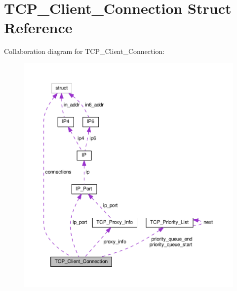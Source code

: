 \hypertarget{struct_t_c_p___client___connection}{\section{T\+C\+P\+\_\+\+Client\+\_\+\+Connection Struct Reference}
\label{struct_t_c_p___client___connection}
}


Collaboration diagram for T\+C\+P\+\_\+\+Client\+\_\+\+Connection\+:
\nopagebreak
\begin{figure}[H]
\begin{center}
\leavevmode
\includegraphics[width=350pt]{struct_t_c_p___client___connection__coll__graph}
\end{center}
\end{figure}
